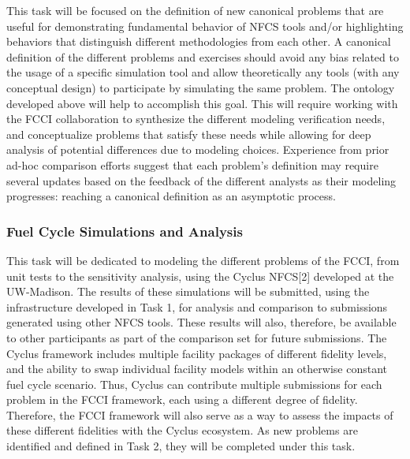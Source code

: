 This task will be focused on the definition of new canonical problems that are
useful for demonstrating fundamental behavior of NFCS tools and/or highlighting
behaviors that distinguish different methodologies from each other. A canonical
definition of the different problems and exercises should avoid any bias related
to the usage of a specific simulation tool and allow theoretically any tools
(with any conceptual design) to participate by simulating the same problem. The
ontology developed above will help to accomplish this goal. This will require
working with the FCCI collaboration to synthesize the different modeling
verification needs, and conceptualize problems that satisfy these needs while
allowing for deep analysis of potential differences due to modeling choices.
Experience from prior ad-hoc comparison efforts suggest that each problem’s
definition may require several updates based on the feedback of the different
analysts as their modeling progresses: reaching a canonical definition as an
asymptotic process. 


\subsubsection{Fuel Cycle Simulations and Analysis} 

This task will be dedicated to modeling the different problems of the FCCI, from
unit tests to the sensitivity analysis, using the Cyclus NFCS[2] developed at
the UW-Madison. The results of these simulations will be submitted, using the
infrastructure developed in Task 1, for analysis and comparison to submissions
generated using other NFCS tools. These results will also, therefore, be
available to other participants as part of the comparison set for future
submissions. The Cyclus framework includes multiple facility packages of
different fidelity levels, and the ability to swap individual facility models
within an otherwise constant fuel cycle scenario. Thus, Cyclus can contribute
multiple submissions for each problem in the FCCI framework, each using a
different degree of fidelity. Therefore, the FCCI framework will also serve as
a way to assess the impacts of these different fidelities with the Cyclus
ecosystem. As new problems are identified and defined in Task 2, they will be
completed under this task.


